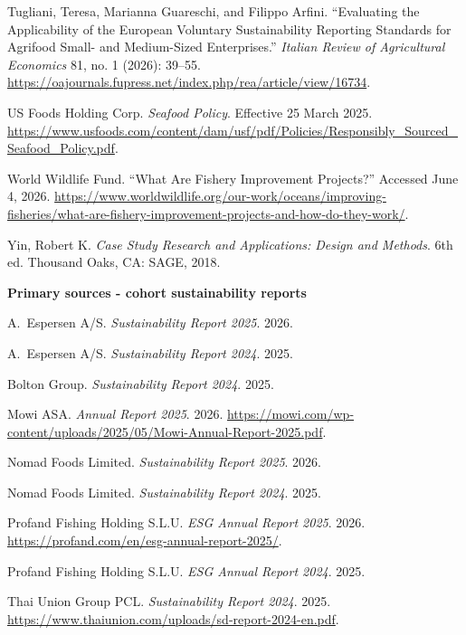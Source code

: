 Tugliani, Teresa, Marianna Guareschi, and Filippo Arfini. ``Evaluating the Applicability of the European Voluntary Sustainability Reporting Standards for Agrifood Small- and Medium-Sized Enterprises.'' \emph{Italian Review of Agricultural Economics} 81, no. 1 (2026): 39--55. \url{https://oajournals.fupress.net/index.php/rea/article/view/16734}.

US Foods Holding Corp. \emph{Seafood Policy}. Effective 25 March 2025. \url{https://www.usfoods.com/content/dam/usf/pdf/Policies/Responsibly\_Sourced\_Seafood\_Policy.pdf}. %

World Wildlife Fund. ``What Are Fishery Improvement Projects?'' Accessed June 4, 2026. \url{https://www.worldwildlife.org/our-work/oceans/improving-fisheries/what-are-fishery-improvement-projects-and-how-do-they-work/}.

Yin, Robert K. \emph{Case Study Research and Applications: Design and Methods}. 6th ed. Thousand Oaks, CA: SAGE, 2018. %

\endgroup

\medskip
{\small\noindent\textbf{Primary sources - cohort sustainability reports}\par}
\begingroup
\setlength{\parindent}{0pt}\setlength{\parskip}{6pt}\small
{}

A.~Espersen A/S. \emph{Sustainability Report 2025}. 2026. %

A.~Espersen A/S. \emph{Sustainability Report 2024}. 2025. %

Bolton Group. \emph{Sustainability Report 2024}. 2025.

Mowi ASA. \emph{Annual Report 2025}. 2026. \url{https://mowi.com/wp-content/uploads/2025/05/Mowi-Annual-Report-2025.pdf}.

Nomad Foods Limited. \emph{Sustainability Report 2025}. 2026. %

Nomad Foods Limited. \emph{Sustainability Report 2024}. 2025. %

Profand Fishing Holding S.L.U. \emph{ESG Annual Report 2025}. 2026. \url{https://profand.com/en/esg-annual-report-2025/}.

Profand Fishing Holding S.L.U. \emph{ESG Annual Report 2024}. 2025. %

Thai Union Group PCL. \emph{Sustainability Report 2024}. 2025. \url{https://www.thaiunion.com/uploads/sd-report-2024-en.pdf}.
\endgroup
